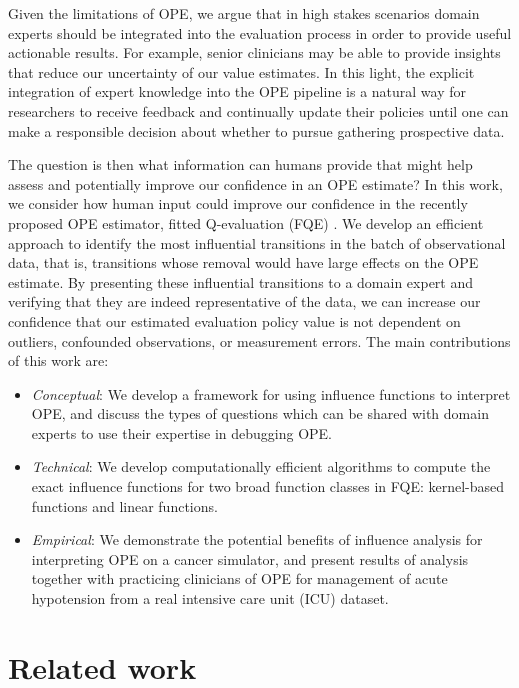\documentclass{article}
\begin{document}
Given the limitations of OPE, we argue that in high stakes scenarios domain experts should be integrated into the evaluation process in order to provide useful actionable results. For example, senior clinicians may be able to provide insights that reduce our uncertainty of our value estimates. In this light, the explicit integration of expert knowledge into the OPE pipeline is a natural way for researchers to receive feedback and continually update their policies until one can make a responsible decision about whether to pursue gathering prospective data.

The question is then what information can humans provide that might help assess and potentially improve our confidence in an OPE estimate? In this work, we consider how human input could improve our confidence in the recently proposed OPE estimator, fitted Q-evaluation (FQE) \cite{le2019batch}.  We develop an efficient approach to identify the most influential transitions in the batch of observational data, that is, transitions whose removal would have large effects on the OPE estimate. By presenting these influential transitions to a domain expert and verifying that they are indeed representative of the data, we can increase our confidence that our estimated evaluation policy value is not dependent on outliers, confounded observations, or measurement errors. The main contributions of this work are:

\begin{itemize}
    \item \emph{Conceptual}: We develop a framework for using influence functions to interpret OPE, and discuss the types of questions which can be shared with domain experts to use their expertise in debugging OPE.
    \item \emph{Technical}:  We develop computationally efficient algorithms to compute the exact influence functions for two broad function classes in FQE: kernel-based functions and linear functions.
    \item \emph{Empirical}: We demonstrate the potential benefits of influence analysis for interpreting OPE on a cancer simulator, and present results of analysis together with practicing clinicians of OPE for management of acute hypotension from a real intensive care unit (ICU) dataset.
\end{itemize}

\section{Related work}
\end{document}
